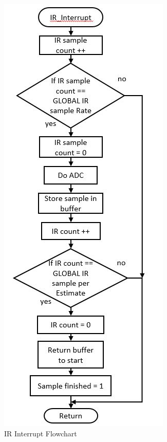 \documentclass[MTRX3700report.tex]{subfiles}
\begin{document}
\begin{figure}[h]
	\includegraphics[scale=0.8]{IR_interrupt.jpg}
	\centering
	\caption{IR Interrupt Flowchart}
\end{figure}
\end{document}
